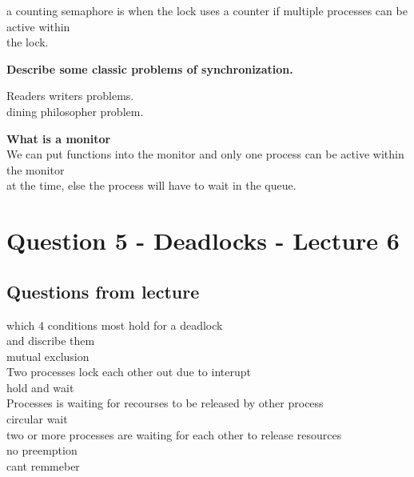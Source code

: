 \documentclass[a4paper,10pt,titlepage]{report}
\begin{document}
\hspace{10mm}  a counting semaphore is when the lock uses a counter if multiple processes can be active within \\
\hspace{10mm}  the lock. \\ \vspace{5mm}


\textbf{Describe some classic problems of synchronization. \\}

\hspace{10mm}  Readers writers problems.\\
\hspace{10mm} dining philosopher problem. \\ \vspace{5mm}


\textbf{What is a monitor \\}
\hspace{10mm}  We can put functions into the monitor and only one process can be active within the monitor \\
\hspace{10mm} at the time, else the process will have to wait in the queue.


\newpage
\section{Question 5 - Deadlocks - Lecture 6}
\subsection{Questions from lecture}
which 4 conditions most hold for a deadlock\\
\hspace{10mm} and discribe them \\
\hspace{10mm} mutual exclusion\\
\hspace{20mm} Two processes lock each other out due to interupt  \\
\hspace{10mm} hold and wait\\
\hspace{20mm} Processes is waiting for recourses to be released by other process \\
\hspace{10mm} circular wait\\
\hspace{20mm} two or more processes are waiting for each other to release resources \\
\hspace{10mm} no preemption\\
\hspace{20mm} cant remmeber \\
\end{document}
